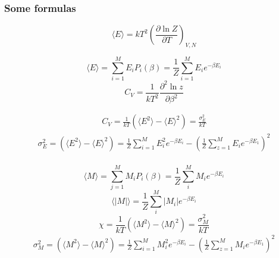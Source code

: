 \documentclass[%
 reprint,
nofootinbib,
aps,
]{revtex4-1}
\begin{document}
\subsubsection{Some formulas}
\begin{equation}
    \langle E \rangle = kT^2 \left( \frac{\partial \ln Z}{\partial T} \right) _{V,N}
    \label{eq:<E>_def}
\end{equation}


\begin{equation}
    \langle E \rangle = \sum_{i=1}^M E_iP_i(\beta) = \frac{1}{Z}\sum_{i=1}^M E_ie^{-\beta E_i}
    \label{eq:<E>}
\end{equation}
\begin{equation}
    C_V =\frac{1}{kT^2} \frac{\partial^2\ln{z}}{\partial \beta^2}
    \label{eq:C_V1}
\end{equation}

\begin{align*}
    C_V = \frac{1}{kT}(\langle E^2\rangle - \langle E\rangle^2) = \frac{\sigma_E^2}{kT}
\end{align*}
\begin{align*}
    \sigma_E^2 = (\langle E^2\rangle - \langle E\rangle^2) = \frac{1}{Z}\sum_{i=1}^M E^2_ie^{-\beta E_i} - \left(\frac{1}{Z}\sum_{z=1}^M E_i e^{-\beta E_1}\right)^2
\end{align*}
\\
\begin{equation}
    \langle M \rangle = \sum_{j=1}^M M_iP_i(\beta) = \frac{1}{Z} \sum_i^M M_i e^{-\beta E_i}
    \label{eq:<M>}
\end{equation}
\begin{equation}
    \langle|M|\rangle = \frac{1}{Z}\sum_i^M |M_i|e^{-\beta E_i}
    \label{eq:<|M|>}
\end{equation}
\begin{equation}
    \chi = \frac{1}{kT}\left(\langle M^2 \rangle - \langle M \rangle^2\right) = \frac{\sigma_{M}^2}{kT}
    \label{eq:chi}
\end{equation}
\begin{align*}
    \sigma_{M}^2 = (\langle M^2\rangle - \langle M\rangle^2) = \frac{1}{Z}\sum_{i=1}^M M^2_ie^{-\beta E_i} - \left(\frac{1}{Z}\sum_{z=1}^M M_i e^{-\beta E_1}\right)^2
\end{align*}
\end{document}
